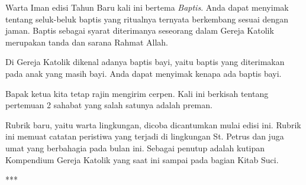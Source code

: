 \newpage





Warta Iman edisi Tahun Baru kali ini bertema \textit{Baptis}. Anda dapat menyimak tentang seluk-beluk baptis yang ritualnya ternyata berkembang sesuai dengan jaman. Baptis sebagai syarat diterimanya seseorang dalam Gereja Katolik merupakan tanda dan sarana Rahmat Allah.

\bigskip

Di Gereja Katolik dikenal adanya baptis bayi, yaitu baptis yang diterimakan pada anak yang masih bayi. Anda dapat menyimak kenapa ada baptis bayi.

\bigskip

Bapak ketua kita tetap rajin mengirim cerpen. Kali ini berkisah tentang pertemuan 2 sahabat yang salah satunya adalah preman. 

\bigskip

Rubrik baru, yaitu warta lingkungan, dicoba dicantumkan mulai edisi ini. Rubrik ini memuat catatan peristiwa yang terjadi di lingkungan St. Petrus dan juga umat yang berbahagia pada bulan ini.
Sebagai penutup adalah kutipan Kompendium Gereja Katolik yang saat ini  sampai pada bagian Kitab Suci.

\begin{center}***\end{center} 

\vfill




